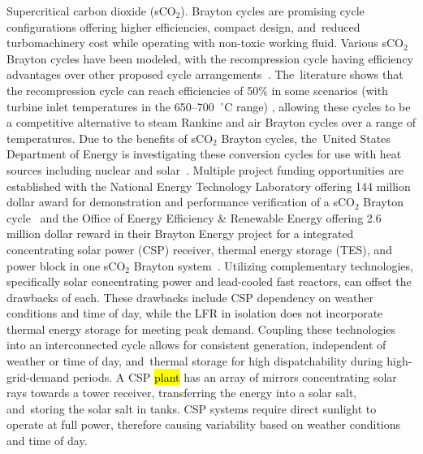 \documentclass[sustainability,article,accept,moreauthors,pdftex]{Definitions/mdpi}
\begin{document}
{Supercritical carbon dioxide (sCO$_2$).}
Brayton cycles are promising cycle configurations offering higher efficiencies, compact design, and~reduced turbomachinery cost while operating with non-toxic working fluid. Various sCO$_2$ Brayton cycles have been modeled, with the recompression cycle having efficiency advantages over other proposed cycle arrangements~\cite{turchi_2013,ahn_2014,wang_2018}. The~literature shows that the recompression cycle can reach efficiencies of 50\% in some scenarios (with turbine inlet temperatures in the 650--700 $~^{\circ}$C range) \cite{turchi_2013,wright_2009}, allowing these cycles to be a competitive alternative to steam Rankine and air Brayton cycles over a range of temperatures. Due to the benefits of sCO$_2$ Brayton cycles, the~United States Department of Energy is investigating these conversion cycles for use with heat sources including nuclear and solar~\cite{doe_2012}. Multiple project funding opportunities are established with the National Energy Technology Laboratory offering 144 million dollar award for demonstration and performance verification of a sCO$_2$ Brayton cycle~\cite{netl_2016} and the Office of Energy Efficiency \& Renewable Energy offering 2.6 million dollar reward in their Brayton Energy project for a integrated %
{concentrating solar power (CSP) receiver, thermal energy storage (TES),}
and power block in one sCO$_2$ Brayton system~\cite{seto_2015}. Utilizing complementary technologies, specifically solar concentrating power and lead-cooled fast reactors, can offset the drawbacks of each. %
{These drawbacks include CSP dependency on weather conditions and time of day, while the LFR in isolation does not incorporate thermal energy storage for meeting peak demand.}
Coupling these technologies into an interconnected cycle allows for consistent generation, independent of weather or time of day, and~thermal storage for high dispatchability during high-grid-demand periods. 
A CSP \hl{plant} has an array of mirrors concentrating solar rays towards a %
{tower receiver, transferring the energy into a solar salt, and~storing the solar salt in tanks. CSP systems require direct sunlight to operate at full power, therefore causing variability based on weather conditions and time of day.}
\end{document}
